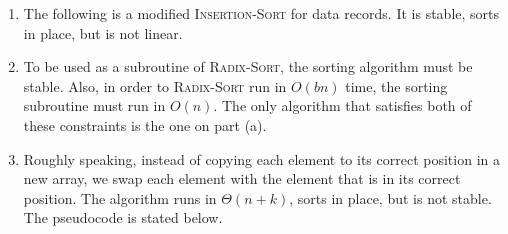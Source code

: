 \documentclass{report}
\makeatletter
\renewenvironment{framed}{%
 \def\FrameCommand##1{\hskip\@totalleftmargin
 \fboxsep=\FrameSep\fbox{##1}}%
 \MakeFramed {\advance\hsize-\width
   \@totalleftmargin\z@ \linewidth\hsize
   \@setminipage}}%
 {\par\unskip\endMakeFramed}
\let\oldnl\nl%
\newcommand{\nonl}{\renewcommand{\nl}{\let\nl\oldnl}}%
\makeatother
\begin{document}
\begin{enumerate}
\begin{framed}
\begin{enumerate}
{\begin{algorithm}[H]
\SetAlgoNoEnd\DontPrintSemicolon
\BlankLine
{}
\nonl{}
\end{algorithm}
}

\item{The following is a modified \textsc{Insertion-Sort} for data records. It
is stable, sorts in place, but is not linear.

\begin{algorithm}[H]
\SetAlgoNoEnd\DontPrintSemicolon
\BlankLine
{}
\nonl{}
\end{algorithm}
}

\newpage

\item{To be used as a subroutine of \textsc{Radix-Sort}, the sorting algorithm
must be stable. Also, in order to \textsc{Radix-Sort} run in $O(bn)$ time, the
sorting subroutine must run in $O(n)$. The only algorithm that satisfies both of
these constraints is the one on part (a).}

\item{Roughly speaking, instead of copying each element to its correct position
in a new array, we swap each element with the element that is in its correct
position. The algorithm runs in $\Theta(n + k)$, sorts in place, but is not
stable. The pseudocode is stated below.

\begin{algorithm}[H]
\SetAlgoNoEnd\DontPrintSemicolon
\BlankLine
{}
\nonl{}
\end{algorithm}
}


\end{enumerate}
\end{framed}
\end{enumerate}
\end{document}
